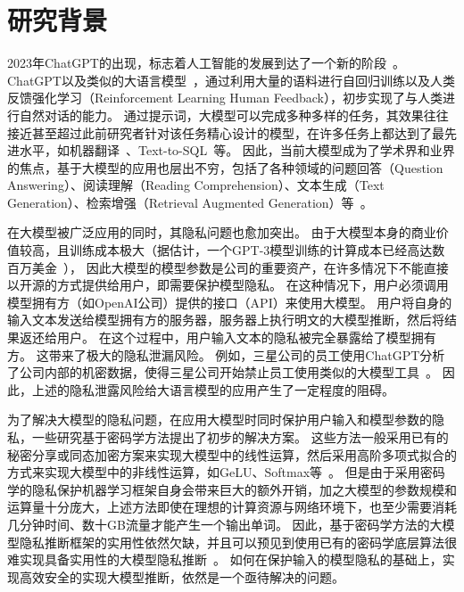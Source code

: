 \section{研究背景}
2023年ChatGPT的出现，标志着人工智能的发展到达了一个新的阶段~\cite{chatgpt}。
%
ChatGPT以及类似的大语言模型~\cite{touvron_2023_llama,zeng_2022_glm130b,jiang_2023_mistral,2023_gemini}，通过利用大量的语料进行自回归训练以及人类反馈强化学习（Reinforcement Learning Human Feedback），初步实现了与人类进行自然对话的能力。
%
通过提示词，大模型可以完成多种多样的任务，其效果往往接近甚至超过此前研究者针对该任务精心设计的模型，在许多任务上都达到了最先进水平，如机器翻译~\cite{jiaowenxiang_2023_llm_translation}、Text-to-SQL~\cite{gaodawei_2024_text2sql_llm}等。
%
因此，当前大模型成为了学术界和业界的焦点，基于大模型的应用也层出不穷，包括了各种领域的问题回答（Question Answering）、阅读理解（Reading Comprehension）、文本生成（Text Generation）、检索增强（Retrieval Augmented Generation）等~\cite{zhao_2023_llm_survey}。


在大模型被广泛应用的同时，其隐私问题也愈加突出。
%
由于大模型本身的商业价值较高，且训练成本极大（据估计，一个GPT-3模型训练的计算成本已经高达数百万美金~\cite{gpt3_technical_report}），
因此大模型的模型参数是公司的重要资产，在许多情况下不能直接以开源的方式提供给用户，即需要保护模型隐私。
%
在这种情况下，用户必须调用模型拥有方（如OpenAI公司）提供的接口（API）来使用大模型。
%
用户将自身的输入文本发送给模型拥有方的服务器，服务器上执行明文的大模型推断，然后将结果返还给用户。
%
在这个过程中，用户输入文本的隐私被完全暴露给了模型拥有方。
%
这带来了极大的隐私泄漏风险。
%
例如，三星公司的员工使用ChatGPT分析了公司内部的机密数据，使得三星公司开始禁止员工使用类似的大模型工具~\cite{samsung_chatgpt_leak}。
%
因此，上述的隐私泄露风险给大语言模型的应用产生了一定程度的阻碍。


为了解决大模型的隐私问题，在应用大模型时同时保护用户输入和模型参数的隐私，一些研究基于密码学方法提出了初步的解决方案。
%
这些方法一般采用已有的秘密分享或同态加密方案来实现大模型中的线性运算，然后采用高阶多项式拟合的方式来实现大模型中的非线性运算，如GeLU、Softmax等~\cite{pang_2024_bolt_transformer,hou2023ciphergpt,dong2023puma,lu2023bumblebee}。
%
但是由于采用密码学的隐私保护机器学习框架自身会带来巨大的额外开销，加之大模型的参数规模和运算量十分庞大，上述方法即使在理想的计算资源与网络环境下，也至少需要消耗几分钟时间、数十GB流量才能产生一个输出单词。
%
因此，基于密码学方法的大模型隐私推断框架的实用性依然欠缺，并且可以预见到使用已有的密码学底层算法很难实现具备实用性的大模型隐私推断~\cite{hou2023ciphergpt}。
%
如何在保护输入的模型隐私的基础上，实现高效安全的实现大模型推断，依然是一个亟待解决的问题。
